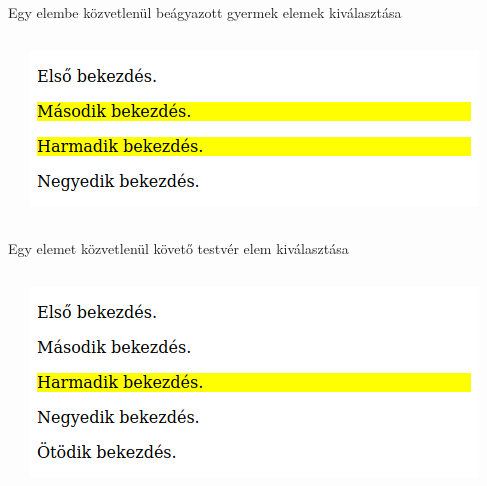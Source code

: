 \begin{frame}
  Egy elembe közvetlenül beágyazott gyermek elemek kiválasztása
  \begin{columns}[c]
      \begin{exampleblock}{}
        \footnotesize
        
        
      \end{exampleblock}
      \includegraphics[width=\textwidth]{gyermek.png}
  \end{columns}
\end{frame}

\begin{frame}
  Egy elemet közvetlenül követő testvér elem kiválasztása
  \begin{columns}[c]
      \begin{exampleblock}{}
        \footnotesize
        
        
      \end{exampleblock}
      \includegraphics[width=\textwidth]{testver.png}
  \end{columns}
\end{frame}

